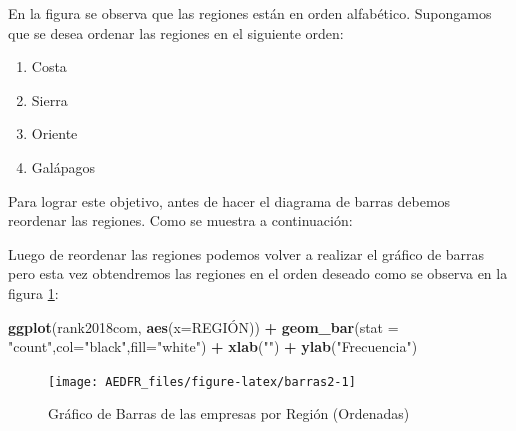 \documentclass[letterpaper,]{book}
\newenvironment{Shaded}{\begin{snugshade}}{\end{snugshade}}
\newcommand{\DataTypeTok}[1]{\textcolor[rgb]{0.13,0.29,0.53}{#1}}
\newcommand{\KeywordTok}[1]{\textcolor[rgb]{0.13,0.29,0.53}{\textbf{#1}}}
\newcommand{\NormalTok}[1]{#1}
\newcommand{\OperatorTok}[1]{\textcolor[rgb]{0.81,0.36,0.00}{\textbf{#1}}}
\newcommand{\StringTok}[1]{\textcolor[rgb]{0.31,0.60,0.02}{#1}}
\providecommand{\tightlist}{%
  \setlength{\itemsep}{0pt}\setlength{\parskip}{0pt}}
\begin{document}
En la figura se observa que las regiones están en orden alfabético. Supongamos que se desea ordenar las regiones en el siguiente orden:

\begin{enumerate}
\def\labelenumi{\arabic{enumi}.}
\tightlist
\item
  Costa
\item
  Sierra
\item
  Oriente
\item
  Galápagos
\end{enumerate}

Para lograr este objetivo, antes de hacer el diagrama de barras debemos reordenar las regiones. Como se muestra a continuación:

\begin{Shaded}
\end{Shaded}

Luego de reordenar las regiones podemos volver a realizar el gráfico de barras pero esta vez obtendremos las regiones en el orden deseado como se observa en la figura \ref{fig:barras2}:

\begin{Shaded}
\begin{Highlighting}[]
\KeywordTok{ggplot}\NormalTok{(rank2018com, }\KeywordTok{aes}\NormalTok{(}\DataTypeTok{x=}\NormalTok{REGIÓN)) }\OperatorTok{+}\StringTok{ }
\StringTok{  }\KeywordTok{geom_bar}\NormalTok{(}\DataTypeTok{stat =} \StringTok{"count"}\NormalTok{,}\DataTypeTok{col=}\StringTok{"black"}\NormalTok{,}\DataTypeTok{fill=}\StringTok{"white"}\NormalTok{) }\OperatorTok{+}
\StringTok{  }\KeywordTok{xlab}\NormalTok{(}\StringTok{""}\NormalTok{) }\OperatorTok{+}\StringTok{ }\KeywordTok{ylab}\NormalTok{(}\StringTok{"Frecuencia"}\NormalTok{)}
\end{Highlighting}
\end{Shaded}

\begin{figure}[h!]

{\centering \texttt{[image: AEDFR\_files/figure-latex/barras2-1]} 

}

\caption{Gráfico de Barras de las empresas por Región (Ordenadas)}\label{fig:barras2}
\end{figure}
\end{document}
